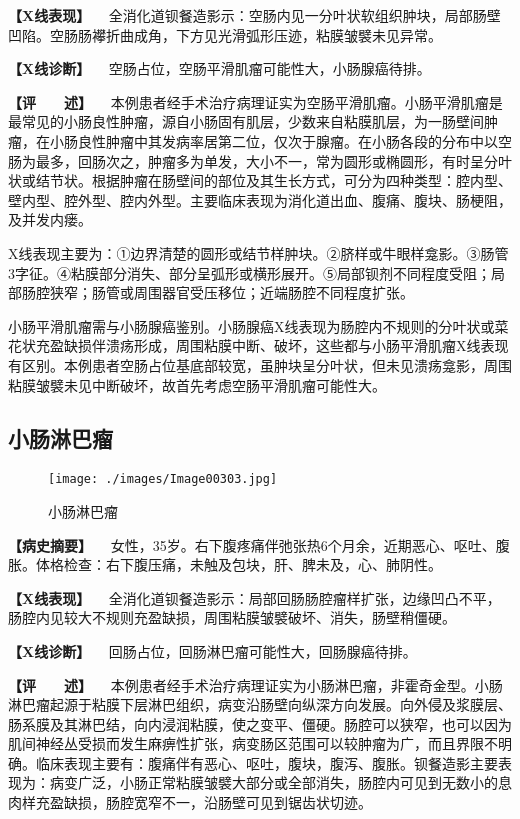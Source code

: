 \textbf{【X线表现】}
　全消化道钡餐造影示：空肠内见一分叶状软组织肿块，局部肠壁凹陷。空肠肠襻折曲成角，下方见光滑弧形压迹，粘膜皱襞未见异常。

\textbf{【X线诊断】} 　空肠占位，空肠平滑肌瘤可能性大，小肠腺癌待排。

\textbf{【评　　述】}
　本例患者经手术治疗病理证实为空肠平滑肌瘤。小肠平滑肌瘤是最常见的小肠良性肿瘤，源自小肠固有肌层，少数来自粘膜肌层，为一肠壁间肿瘤，在小肠良性肿瘤中其发病率居第二位，仅次于腺瘤。在小肠各段的分布中以空肠为最多，回肠次之，肿瘤多为单发，大小不一，常为圆形或椭圆形，有时呈分叶状或结节状。根据肿瘤在肠壁间的部位及其生长方式，可分为四种类型：腔内型、壁内型、腔外型、腔内外型。主要临床表现为消化道出血、腹痛、腹块、肠梗阻，及并发内瘘。

X线表现主要为：①边界清楚的圆形或结节样肿块。②脐样或牛眼样龛影。③肠管3字征。④粘膜部分消失、部分呈弧形或横形展开。⑤局部钡剂不同程度受阻；局部肠腔狭窄；肠管或周围器官受压移位；近端肠腔不同程度扩张。

小肠平滑肌瘤需与小肠腺癌鉴别。小肠腺癌X线表现为肠腔内不规则的分叶状或菜花状充盈缺损伴溃疡形成，周围粘膜中断、破坏，这些都与小肠平滑肌瘤X线表现有区别。本例患者空肠占位基底部较宽，虽肿块呈分叶状，但未见溃疡龛影，周围粘膜皱襞未见中断破坏，故首先考虑空肠平滑肌瘤可能性大。

\subsection{小肠淋巴瘤}

\begin{figure}[!htbp]
 \centering
 \texttt{[image: ./images/Image00303.jpg]}
 \captionsetup{justification=centering}
 \caption{小肠淋巴瘤}
 \label{fig5-5-7}
  \end{figure} 

\textbf{【病史摘要】}
　女性，35岁。右下腹疼痛伴弛张热6个月余，近期恶心、呕吐、腹胀。体格检查：右下腹压痛，未触及包块，肝、脾未及，心、肺阴性。

\textbf{【X线表现】}
　全消化道钡餐造影示：局部回肠肠腔瘤样扩张，边缘凹凸不平，肠腔内见较大不规则充盈缺损，周围粘膜皱襞破坏、消失，肠壁稍僵硬。

\textbf{【X线诊断】} 　回肠占位，回肠淋巴瘤可能性大，回肠腺癌待排。

\textbf{【评　　述】}
　本例患者经手术治疗病理证实为小肠淋巴瘤，非霍奇金型。小肠淋巴瘤起源于粘膜下层淋巴组织，病变沿肠壁向纵深方向发展。向外侵及浆膜层、肠系膜及其淋巴结，向内浸润粘膜，使之变平、僵硬。肠腔可以狭窄，也可以因为肌间神经丛受损而发生麻痹性扩张，病变肠区范围可以较肿瘤为广，而且界限不明确。临床表现主要有：腹痛伴有恶心、呕吐，腹块，腹泻、腹胀。钡餐造影主要表现为：病变广泛，小肠正常粘膜皱襞大部分或全部消失，肠腔内可见到无数小的息肉样充盈缺损，肠腔宽窄不一，沿肠壁可见到锯齿状切迹。

